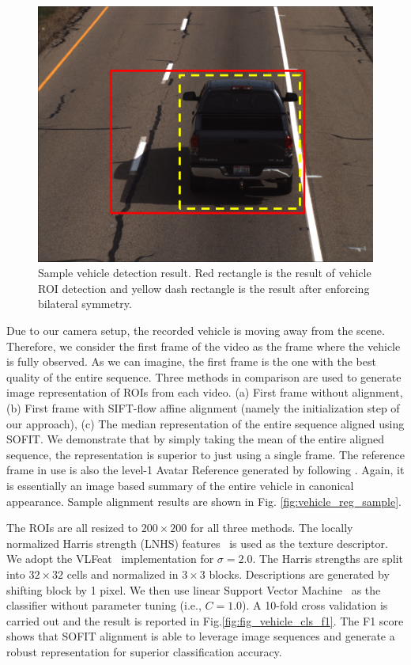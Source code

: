 \documentclass[10pt,journal]{IEEEtran}
\begin{document}
\begin{figure}[htbp]
	\centering
		\includegraphics[width=.9\columnwidth]{fig/vehicle_raw_data.png}
	\caption{Sample vehicle detection result. Red rectangle is the result of vehicle ROI detection and yellow dash rectangle is the result after enforcing bilateral symmetry.}
	\label{fig:vehicle_raw_data}
\end{figure}

Due to our camera setup, the recorded vehicle is moving away from the scene. Therefore, we consider the first frame of the video as the frame where the vehicle is fully observed. As we can imagine, the first frame is the one with the best quality of the entire sequence. Three methods in comparison are used to generate image representation of ROIs from each video. (a) First frame without alignment, (b) First frame with SIFT-flow affine alignment (namely the initialization step of our approach), (c) The median representation of the entire sequence aligned using SOFIT. We demonstrate that by simply taking the mean of the entire aligned sequence, the representation is superior to just using a single frame. The reference frame in use is also the level-1 Avatar Reference generated by following \cite{Yang_SMCB12}. Again, it is essentially an image based summary of the entire vehicle in canonical appearance. Sample alignment results are shown in Fig. \ref{fig:vehicle_reg_sample}.

The ROIs are all resized to $200\times200$ for all three methods. The locally normalized Harris strength (LNHS) features~\cite{Pearce11} is used as the texture descriptor. We adopt the VLFeat~\cite{vlfeat} implementation for $\sigma=2.0$. The Harris strengths are split into $32\times32$ cells and normalized in $3\times3$ blocks. Descriptions are generated by shifting block by 1 pixel. We then use linear Support Vector Machine~\cite{sklearn} as the classifier without parameter tuning (i.e., $C=1.0$). A 10-fold cross validation is carried out and the result is reported in Fig.\ref{fig:fig_vehicle_cls_f1}. The F1 score shows that SOFIT alignment is able to leverage image sequences and generate a robust representation for superior classification accuracy. 
\end{document}
